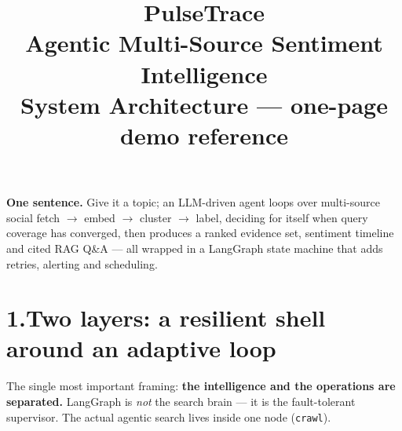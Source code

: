 \documentclass[11pt,a4paper]{article}
\title{\vspace{-1.2cm}\textbf{PulseTrace}\\[2pt]
\large Agentic Multi-Source Sentiment Intelligence\\[2pt]
\normalsize\textcolor{rule}{System Architecture --- one-page demo reference}}
\author{}
\date{}
\newcommand{\code}[1]{\texttt{\small #1}}
\begin{document}
\maketitle
\vspace{-1.4cm}

\noindent\textbf{One sentence.} Give it a topic; an LLM-driven agent loops over
multi-source social fetch $\rightarrow$ embed $\rightarrow$ cluster $\rightarrow$
label, deciding for itself when query coverage has converged, then produces a
ranked evidence set, sentiment timeline and cited RAG Q\&A --- all wrapped in a
LangGraph state machine that adds retries, alerting and scheduling.

\section*{1.\quad Two layers: a resilient shell around an adaptive loop}

The single most important framing: \textbf{the intelligence and the operations
are separated.} LangGraph is \emph{not} the search brain --- it is the
fault-tolerant supervisor. The actual agentic search lives inside one node
(\code{crawl}).
\end{document}
